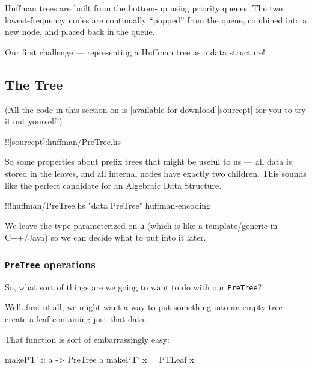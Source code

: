 \documentclass[]{article}
\newenvironment{Shaded}{}{}
\newcommand{\DataTypeTok}[1]{\textcolor[rgb]{0.56,0.13,0.00}{{#1}}}
\newcommand{\StringTok}[1]{\textcolor[rgb]{0.25,0.44,0.63}{{#1}}}
\newcommand{\OtherTok}[1]{\textcolor[rgb]{0.00,0.44,0.13}{{#1}}}
\newcommand{\FunctionTok}[1]{\textcolor[rgb]{0.02,0.16,0.49}{{#1}}}
\newcommand{\NormalTok}[1]{{#1}}
\begin{document}
Huffman trees are built from the bottom-up using priority queues. The
two lowest-frequency nodes are continually ``popped'' from the queue,
combined into a new node, and placed back in the queue.

Our first challenge --- representing a Huffman tree as a data structure!

\subsection{The Tree}\label{the-tree}

(All the code in this section on is {[}available for
download{]}{[}sourcept{]} for you to try it out yourself!)

!!{[}sourcept{]}:huffman/PreTree.hs

So some properties about prefix trees that might be useful to us --- all
data is stored in the leaves, and all internal nodes have exactly two
children. This sounds like the perfect candidate for an Algebraic Data
Structure.

\begin{Shaded}
\begin{Highlighting}[]
\FunctionTok{!!!}\NormalTok{huffman}\FunctionTok{/}\NormalTok{PreTree.hs }\StringTok{"data PreTree"} \NormalTok{huffman}\FunctionTok{-}\NormalTok{encoding}
\end{Highlighting}
\end{Shaded}

We leave the type parameterized on \texttt{a} (which is like a
template/generic in C++/Java) so we can decide what to put into it
later.

\subsubsection{\texorpdfstring{\texttt{PreTree}
operations}{PreTree operations}}\label{pretree-operations}

So, what sort of things are we going to want to do with our
\texttt{PreTree}?

Well..first of all, we might want a way to put something into an empty
tree --- create a leaf containing just that data.

That function is sort of embarrassingly easy:

\begin{Shaded}
\begin{Highlighting}[]
\OtherTok{makePT' ::} \NormalTok{a }\OtherTok{->} \DataTypeTok{PreTree} \NormalTok{a}
\NormalTok{makePT' x }\FunctionTok{=} \DataTypeTok{PTLeaf} \NormalTok{x}
\end{Highlighting}
\end{Shaded}
\end{document}
